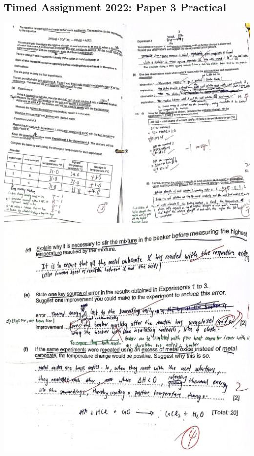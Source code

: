 \documentclass[oneside]{book}
\begin{document}
    \subsection{Timed Assignment 2022: Paper 3 Practical} \begin{center}
        \includegraphics[width=\textwidth,height=\textheight,keepaspectratio]{images/3160BCD6-275B-4763-9466-9476828388DA.jpeg}\\
        \includegraphics[width=\textwidth,height=\textheight,keepaspectratio]{images/BA119F99-18F2-4B3F-B4E9-A8EC52CEAF41.jpeg}\\
    \end{center}
\end{document}
